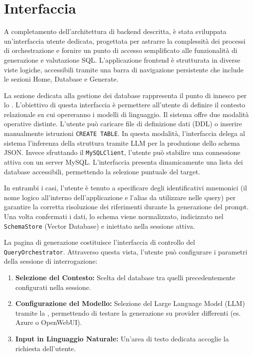 \section{Interfaccia}\label{interfaccia}

A completamento dell'architettura di backend descritta, è stata
sviluppata un'interfaccia utente dedicata, progettata per astrarre la
complessità dei processi di orchestrazione e fornire un punto di accesso
semplificato alle funzionalità di generazione e valutazione SQL.
L'applicazione frontend è strutturata in diverse viste logiche,
accessibili tramite una barra di navigazione persistente che include le
sezioni Home, Database e Generate.

La sezione dedicata alla gestione dei database rappresenta il
punto di innesco per lo . L'obiettivo di
questa interfaccia è permettere all'utente di definire il contesto
relazionale su cui opereranno i modelli di linguaggio. Il sistema
offre due modalità operative distinte. L'utente può caricare file di
definizione dati (DDL) o inserire manualmente istruzioni
\texttt{CREATE\ TABLE}. In questa modalità, l'interfaccia delega al
sistema l'inferenza della struttura tramite LLM per la produzione
dello schema JSON. Invece sfruttando il \texttt{MySQLClient},
l'utente può stabilire una connessione attiva con un server MySQL.
L'interfaccia presenta dinamicamente una lista dei database
accessibili, permettendo la selezione puntuale del target.

In entrambi i casi, l'utente è tenuto a specificare degli identificativi
mnemonici (il nome logico all'interno dell'applicazione e l'alias da
utilizzare nelle query) per garantire la corretta risoluzione dei
riferimenti durante la generazione del prompt. Una volta confermati i
dati, lo schema viene normalizzato, indicizzato nel \texttt{SchemaStore}
(Vector Database) e iniettato nella sessione attiva.


La pagina di generazione costituisce l'interfaccia di controllo del
\texttt{QueryOrchestrator}. Attraverso questa vista, l'utente può
configurare i parametri della sessione di interrogazione:

\begin{enumerate}
\def\labelenumi{\arabic{enumi}.}
\item
  \textbf{Selezione del Contesto:} Scelta del database tra quelli
  precedentemente configurati nella sessione.
\item
  \textbf{Configurazione del Modello:} Selezione del Large Language
  Model (LLM) tramite la , permettendo di
  testare la generazione su provider differenti (es. Azure o
  OpenWebUI).
\item
  \textbf{Input in Linguaggio Naturale:} Un'area di testo dedicata
  accoglie la richiesta dell'utente.
\end{enumerate}


